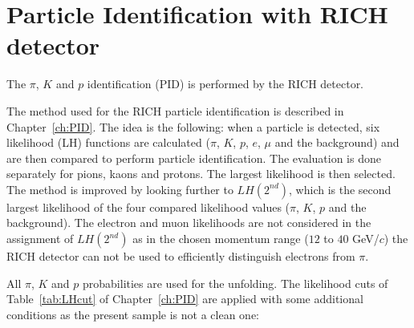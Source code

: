 
\section{Particle Identification with RICH detector}

The $\pi$, $K$ and $p$ identification (PID) is performed by the RICH detector.

The method used for the RICH particle identification is described in Chapter~\ref{ch:PID}. The idea is the following: when a particle is detected, six likelihood (LH) functions are calculated ($\pi$, $K$, $p$, $e$, $\mu$ and the background) and are then compared to perform particle identification. The evaluation is done separately for pions, kaons and protons. The largest likelihood is then selected. The method is improved by looking further to $LH(2^{nd})$, which is the second largest likelihood of the four compared likelihood values ($\pi$, $K$, $p$ and the background). The electron and muon likelihoods are not considered in the assignment of $LH(2^{nd})$ as in the chosen momentum range ($12$ to $40$ GeV/$c$) the RICH detector can not be used to efficiently distinguish electrons from $\pi$.

All $\pi$, $K$ and $p$ probabilities are used for the unfolding. The likelihood cuts of Table~\ref{tab:LHcut} of Chapter~\ref{ch:PID} are applied with some additional conditions as the present sample is not a clean one:

